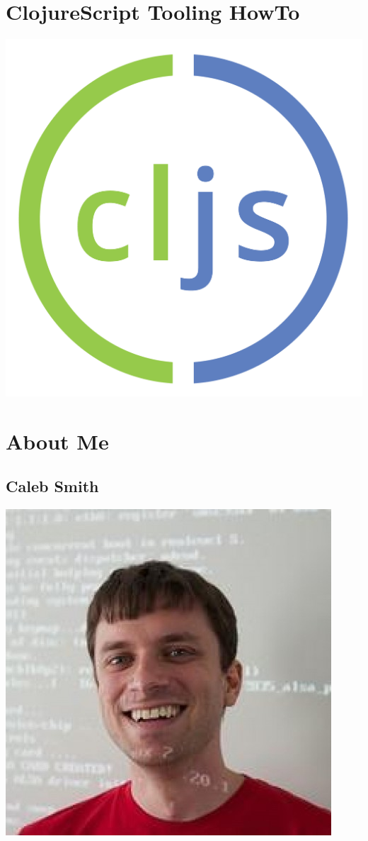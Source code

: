 \documentclass[11pt]{article}
\author{Caleb Smith}
\date{\today}
\title{}
\begin{document}
\tableofcontents

\section{ClojureScript Tooling HowTo}
\label{sec:orgheadline1}
\includegraphics[width=.9\linewidth]{./images/cljs-white.png}

\section{About Me}
\label{sec:orgheadline3}
\subsection{Caleb Smith}
\label{sec:orgheadline2}

\includegraphics[width=.9\linewidth]{./images/avatar.jpg}
\end{document}
